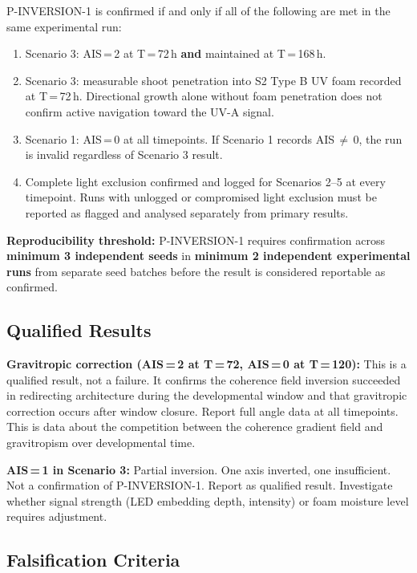 \documentclass[10pt, a4paper]{article}
\begin{document}
P-INVERSION-1 is confirmed if and only if all of the
following are met in the same experimental run:
\begin{enumerate}[itemsep=0.2em]
  \item Scenario 3: AIS\,=\,2 at T\,=\,72\,h
    \textbf{and} maintained at T\,=\,168\,h.
  \item Scenario 3: measurable shoot penetration into
    S2 Type B UV foam recorded at T\,=\,72\,h.
    Directional growth alone without foam penetration
    does not confirm active navigation toward the
    UV-A signal.
  \item Scenario 1: AIS\,=\,0 at all timepoints.
    If Scenario 1 records AIS\,$\ne$\,0, the run is
    invalid regardless of Scenario 3 result.
  \item Complete light exclusion confirmed and logged
    for Scenarios 2--5 at every timepoint.
    Runs with unlogged or compromised light exclusion
    must be reported as flagged and analysed separately
    from primary results.
\end{enumerate}

\textbf{Reproducibility threshold:}
P-INVERSION-1 requires confirmation across
\textbf{minimum 3 independent seeds} in
\textbf{minimum 2 independent experimental runs}
from separate seed batches before the result is
considered reportable as confirmed.

\subsection{Qualified Results}

\textbf{Gravitropic correction (AIS\,=\,2 at T\,=\,72,
AIS\,=\,0 at T\,=\,120):}
This is a qualified result, not a failure.
It confirms the coherence field inversion succeeded in
redirecting architecture during the developmental window
and that gravitropic correction occurs after window
closure. Report full angle data at all timepoints.
This is data about the competition between the coherence
gradient field and gravitropism over developmental time.

\textbf{AIS\,=\,1 in Scenario 3:}
Partial inversion. One axis inverted, one insufficient.
Not a confirmation of P-INVERSION-1.
Report as qualified result. Investigate whether
signal strength (LED embedding depth, intensity)
or foam moisture level requires adjustment.

\subsection{Falsification Criteria}
\end{document}
